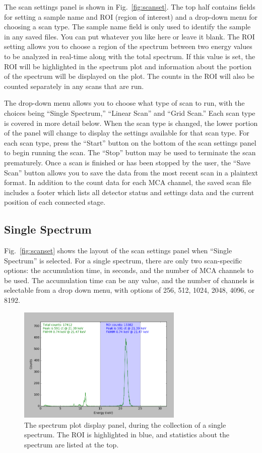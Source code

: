 The scan settings panel is shown in Fig.~\ref{fig:scanset}. The top half
contains fields for setting a sample name and ROI (region of interest) and a
drop-down menu for choosing a scan type. The sample name field is only used to
identify the sample in any saved files. You can put whatever you like here or
leave it blank. The ROI setting allows you to choose a region of the spectrum
between two energy values to be analyzed in real-time along with the total
spectrum. If this value is set, the ROI will be highlighted in the spectrum plot
and information about the portion of the spectrum will be displayed on the
plot. The counts in the ROI will also be counted separately in any scans that
are run.

The drop-down menu allows you to choose what type of scan to run, with the
choices being ``Single Spectrum,'' ``Linear Scan'' and ``Grid Scan.'' Each scan
type is covered in more detail below. When the scan type is changed, the lower
portion of the panel will change to display the settings available for that scan
type.  For each scan type, press the ``Start'' button on the bottom of the scan
settings panel to begin running the scan. The ``Stop'' button may be used to
terminate the scan prematurely. Once a scan is finished or has been stopped by
the user, the ``Save Scan'' button allows you to save the data from the most
recent scan in a plaintext format. In addition to the count data for each MCA
channel, the saved scan file includes a footer which lists all detector status
and settings data and the current position of each connected stage.

\subsection{Single Spectrum}

Fig.~\ref{fig:scanset} shows the layout of the scan settings panel when ``Single
Spectrum'' is selected. For a single spectrum, there are only two scan-specific
options: the accumulation time, in seconds, and the number of MCA channels to be
used. The accumulation time can be any value, and the number of channels is
selectable from a drop down menu, with options of 256, 512, 1024, 2048, 4096, or
8192.

\begin{figure}
\centering \includegraphics[width=0.7\textwidth]{specplot.png}
\caption{\label{fig:specplot} The spectrum plot display panel, during the
  collection of a single spectrum. The ROI is highlighted in blue, and
  statistics about the spectrum are listed at the top.}
\end{figure}

